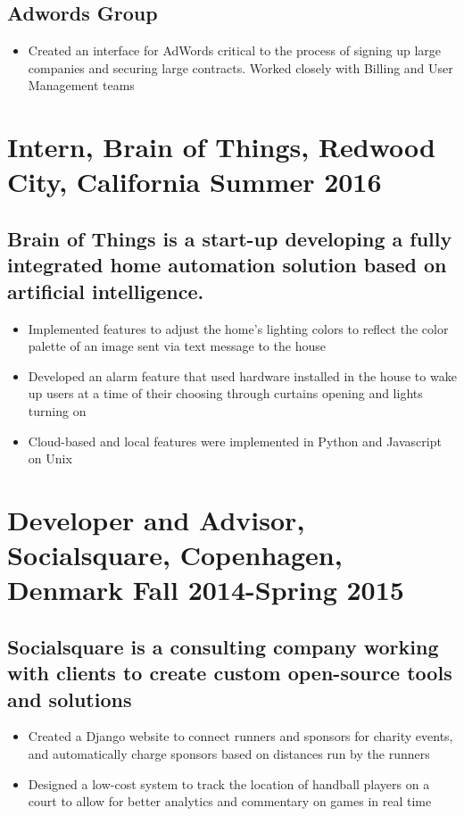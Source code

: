 \documentclass{article}
\begin{document}
\subsection*{Adwords Group}
\begin{itemize}
    \item Created an interface for AdWords critical to the process of signing up large companies and securing large contracts. Worked closely with Billing and User Management teams
\end{itemize}


\section*{\textbf{Intern, Brain of Things, Redwood City, California	\hfill Summer 2016}}
\subsection*{Brain of Things is a start-up developing a fully integrated home automation solution based on artificial intelligence. }
\begin{itemize}[noitemsep]
    \item Implemented features to adjust the home's lighting colors to reflect the color palette of an image sent via text message to the house
    \item Developed an alarm feature that used hardware installed in the house to wake up users at a time of their choosing through curtains opening and lights turning on
    \item Cloud-based and local features were implemented in Python and Javascript on Unix
\end{itemize}

\section*{\textbf{Developer and Advisor, Socialsquare, Copenhagen, Denmark \hfill Fall 2014-Spring 2015}}
\subsection*{Socialsquare is a consulting company working with clients to create custom open-source tools and solutions}
\begin{itemize}[noitemsep]
    \item Created a Django website to connect runners and sponsors for charity events, and automatically charge sponsors based on distances run by the runners
    \item Designed a low-cost system to track the location of handball players on a court to allow for better analytics and commentary on games in real time
\end{itemize}
\end{document}
